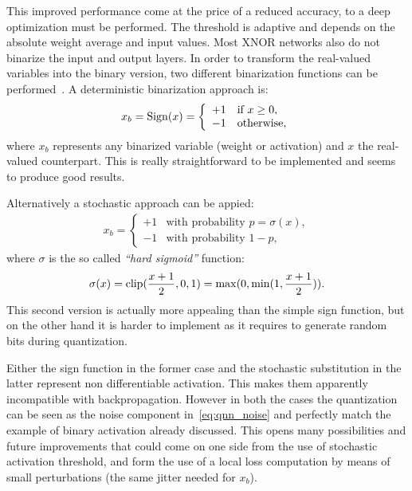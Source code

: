 This improved performance come at the price of a reduced accuracy, to a deep optimization must be performed.
The threshold is adaptive and depends on the absolute weight average and input values.
Most XNOR networks also do not binarize the input and output layers. 
%
In order to transform the real-valued variables into the binary version, two different binarization functions can be performed~\cite{Courbariaux2015BinaryConnectTD}.
A deterministic binarization approach is:
\begin{equation}
    x_b = {\rm Sign}(x) = \left\{ \begin{array}{ll}
                        +1 & \mbox{if $x \geq 0$},\\
                        -1 & \mbox{otherwise},\end{array} \right.
\end{equation}
where $x_b$ represents any binarized variable (weight or activation) and $x$ the real-valued counterpart.
This is really straightforward to be implemented and seems to produce good results.

Alternatively a stochastic approach can be appied:
\begin{align}
\label{eq:sampled-wb}
    x_b = \left\{ \begin{array}{ll}
            +1 & \mbox{with probability $p = \sigma(x)$},\\
            -1 & \mbox{with probability $1-p$},\end{array} \right. 
\end{align}
where $\sigma$ is the so called {\em ``hard sigmoid''} function:
\begin{equation}
    \sigma(x) = {\rm clip}(\frac{x+1}{2},0,1) = \max(0,\min(1,\frac{x+1}{2})).
\end{equation}
This second version is actually more appealing than the simple sign function, but on the other hand it is harder to implement as it requires to generate random bits during quantization.

Either the sign function in the former case and the stochastic substitution in the latter represent non differentiable activation. This makes them apparently incompatible with backpropagation.
However in both the cases the quantization can be seen as the noise component in~\eqref{eq:qnn_noise} and perfectly match the example of binary activation already discussed.
This opens many possibilities and future improvements that could come on one side from the use of stochastic activation threshold, and form the use of a local loss computation by means of small perturbations (the same jitter needed for $x_b$). 
%

